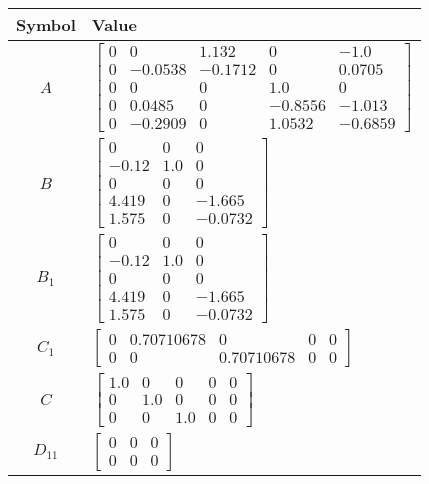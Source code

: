 \begin{tabular}{cl}
\hline
  Symbol  & Value                                                                                                                                                                                             \\
\hline
   $A$    & $\left[\begin{matrix}0 & 0 & 1.132 & 0 & -1.0\\0 & -0.0538 & -0.1712 & 0 & 0.0705\\0 & 0 & 0 & 1.0 & 0\\0 & 0.0485 & 0 & -0.8556 & -1.013\\0 & -0.2909 & 0 & 1.0532 & -0.6859\end{matrix}\right]$ \\
   $B$    & $\left[\begin{matrix}0 & 0 & 0\\-0.12 & 1.0 & 0\\0 & 0 & 0\\4.419 & 0 & -1.665\\1.575 & 0 & -0.0732\end{matrix}\right]$                                                                           \\
 $B_{1}$  & $\left[\begin{matrix}0 & 0 & 0\\-0.12 & 1.0 & 0\\0 & 0 & 0\\4.419 & 0 & -1.665\\1.575 & 0 & -0.0732\end{matrix}\right]$                                                                           \\
 $C_{1}$  & $\left[\begin{matrix}0 & 0.70710678 & 0 & 0 & 0\\0 & 0 & 0.70710678 & 0 & 0\end{matrix}\right]$                                                                                                   \\
   $C$    & $\left[\begin{matrix}1.0 & 0 & 0 & 0 & 0\\0 & 1.0 & 0 & 0 & 0\\0 & 0 & 1.0 & 0 & 0\end{matrix}\right]$                                                                                            \\
 $D_{11}$ & $\left[\begin{matrix}0 & 0 & 0\\0 & 0 & 0\end{matrix}\right]$                                                                                                                                     \\

\end{tabular}
